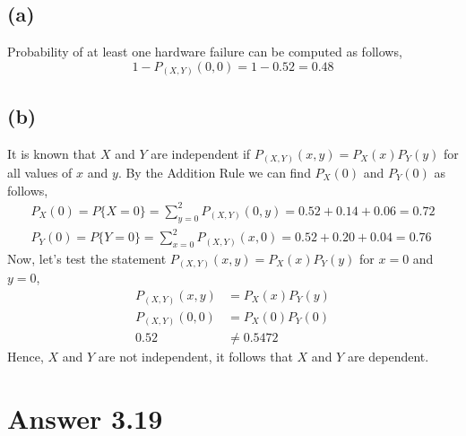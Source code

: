 \documentclass[12pt]{article}
\begin{document}
\subsection*{(a)} Probability of at least one hardware failure can be computed as follows,
\begin{equation}
	1 - P_{(X, Y)}(0, 0) = 1 - 0.52 = 0.48
\end{equation}

\subsection*{(b)} It is known that $X$ and $Y$ are independent if $P_{(X, Y)}(x, y) = P_{X}(x)P_{Y}(y)$ for all values of $x$ and $y$.
By the Addition Rule we can find $P_X(0)$ and $P_Y(0)$ as follows,
\begin{equation}
\begin{split}
	P_X(0) = P\{X = 0\} = \sum_{y = 0}^{2}P_{(X, Y)}(0, y) = 0.52 + 0.14 + 	0.06 = 0.72 \\
	P_Y(0) = P\{Y = 0\} = \sum_{x = 0}^{2}P_{(X, Y)}(x, 0) = 0.52 + 0.20 + 	0.04 = 0.76
\end{split}
\end{equation}
Now, let's test the statement $P_{(X, Y)}(x, y) = P_{X}(x)P_{Y}(y)$ for $x = 0$ and $y = 0$,
\begin{equation}
\begin{split}
	P_{(X, Y)}(x, y) & = P_{X}(x)P_{Y}(y) \\
	P_{(X, Y)}(0, 0) & = P_{X}(0)P_{Y}(0) \\
	0.52 & \neq 0.5472
\end{split}
\end{equation}
Hence, $X$ and $Y$ are not independent, it follows that $X$ and $Y$ are dependent.

\section*{Answer 3.19}
\end{document}
